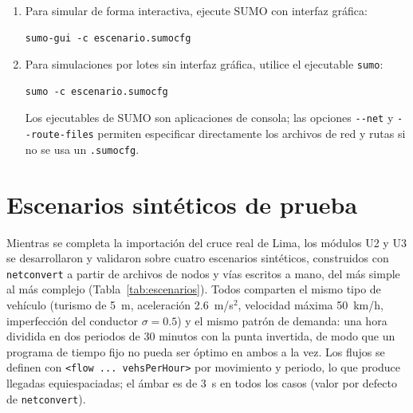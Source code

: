 \begin{enumerate}
  \item Para simular de forma interactiva, ejecute SUMO con
    interfaz gráfica:
    \begin{verbatim}
sumo-gui -c escenario.sumocfg
    \end{verbatim}

  \item Para simulaciones por lotes sin interfaz gráfica, utilice el
    ejecutable \verb|sumo|:
    \begin{verbatim}
sumo -c escenario.sumocfg
    \end{verbatim}
    Los ejecutables de SUMO son aplicaciones de consola; las opciones
    \verb|--net| y \verb|--route-files| permiten especificar
    directamente los archivos de red y rutas si no se usa un
    \texttt{.sumocfg}.
\end{enumerate}

\section{Escenarios sintéticos de prueba}
\label{sec:escenarios}

Mientras se completa la importación del cruce real de Lima, los
módulos U2 y U3 se desarrollaron y validaron sobre cuatro escenarios
sintéticos, construidos con \texttt{netconvert} a partir de archivos de
nodos y vías escritos a mano, del más simple al más complejo
(Tabla~\ref{tab:escenarios}). Todos comparten el mismo tipo de
vehículo (turismo de 5~m, aceleración 2.6~m/s$^2$, velocidad máxima
50~km/h, imperfección del conductor $\sigma = 0.5$) y el mismo patrón
de demanda: una hora dividida en dos periodos de 30 minutos con la
punta invertida, de modo que un programa de tiempo fijo no pueda ser
óptimo en ambos a la vez. Los flujos se definen con
\verb|<flow ... vehsPerHour>| por movimiento y periodo, lo que produce
llegadas equiespaciadas; el ámbar es de 3~s en todos los casos (valor
por defecto de \texttt{netconvert}).

